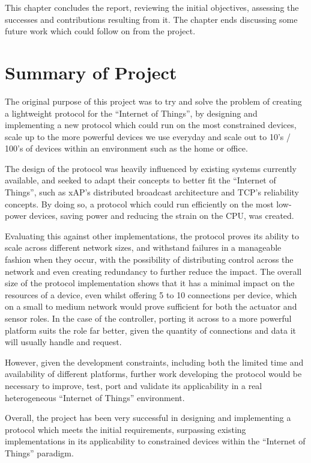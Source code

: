 This chapter concludes the report, reviewing the initial objectives, assessing the successes and contributions resulting from it.
The chapter ends discussing some future work which could follow on from the project.

\section{Summary of Project}
The original purpose of this project was to try and solve the problem of creating a lightweight protocol for the ``Internet of Things'', by designing and implementing a new protocol which could run on the most constrained devices, scale up to the more powerful devices we use everyday and scale out to 10's / 100's of devices within an environment such as the home or office.

The design of the protocol was heavily influenced by existing systems currently available, and seeked to adapt their concepts to better fit the ``Internet of Things'', such as xAP's distributed broadcast architecture and TCP's reliability concepts. By doing so, a protocol which could run efficiently on the most low-power devices, saving power and reducing the strain on the CPU, was created.

Evaluating this against other implementations, the protocol proves its ability to scale across different network sizes, and withstand failures in a manageable fashion when they occur, with the possibility of distributing control across the network and even creating redundancy to further reduce the impact. The overall size of the protocol implementation shows that it has a minimal impact on the resources of a device, even whilst offering 5 to 10 connections per device, which on a small to medium network would prove sufficient for both the actuator and sensor roles. In the case of the controller, porting it across to a more powerful platform suits the role far better, given the quantity of connections and data it will usually handle and request.

However, given the development constraints, including both the limited time and availability of different platforms, further work developing the protocol would be necessary to improve, test, port and validate its applicability in a real heterogeneous ``Internet of Things'' environment.

Overall, the project has been very successful in designing and implementing a protocol which meets the initial requirements, surpassing existing implementations in its applicability to constrained devices within the ``Internet of Things'' paradigm.

